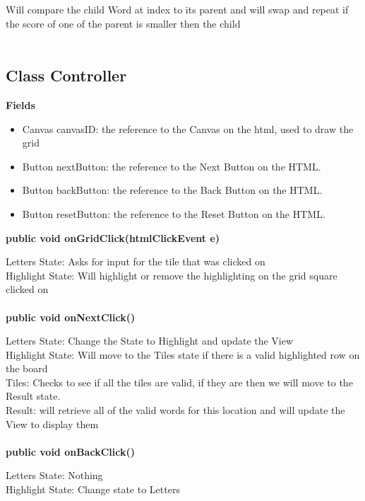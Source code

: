 \documentclass[11pt]{article}
\begin{document}
Will compare the child Word at index to its parent and will swap and repeat if the score of one of the parent is smaller then the child\\\\

\subsection{Class Controller }
\textbf{Fields\\}
\begin{itemize}
	\item Canvas canvasID: the reference to the Canvas on the html, used to draw the grid
	\item Button nextButton: the reference to the Next Button on the HTML.
	\item Button backButton: the reference to the Back Button on the HTML.
	\item Button resetButton: the reference to the Reset Button on the HTML.
\end{itemize}
%
\textbf{public void onGridClick(htmlClickEvent e)\\}

Letters State: Asks for input for the tile that was clicked on\\

Highlight State: Will highlight or remove the highlighting on the grid square clicked on  \\\\
%
\textbf{public void onNextClick()\\}

Letters State: Change the State to Highlight and update the View\\

Highlight State: Will move to the Tiles state if there is a valid highlighted row on the board\\

Tiles: Checks to see if all the tiles are valid, if they are then we will move to the Result state. \\

Result: will retrieve all of the valid words for this location and will update the View to display them\\\\
%
\textbf{public void onBackClick()\\}

Letters State: Nothing\\

Highlight State: Change state to Letters\\
\end{document}
